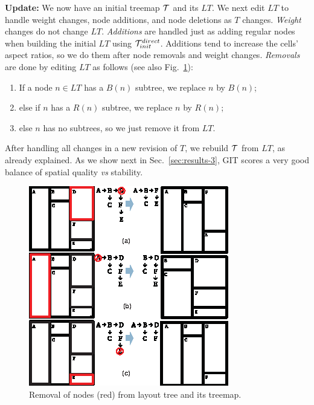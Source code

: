\noindent\textbf{Update:} We now have an initial treemap ${\cal T}$ and its $LT$. We next edit $LT$ to handle weight changes, node additions, and node deletions as $T$ changes. \emph{Weight} changes do not change $LT$. \emph{Additions} are handled just as adding regular nodes when building the initial $LT$ using ${\cal T}_{init}^{direct}$. Additions tend to increase the cells' aspect ratios, so we do them after node removals and weight changes. \emph{Removals} are done by editing $LT$ as follows (see also Fig.~\ref{fig:git_removal}):

\begin{enumerate}
\item If a node $n\in LT$ has a $B(n)$ subtree, we replace $n$ by $B(n)$;
\item else if $n$ has a $R(n)$ subtree, we replace $n$ by $R(n)$;
\item else $n$ has no subtrees, so we just remove it from $LT$.
\end{enumerate}

After handling all changes in a new revision of $T$, we rebuild ${\cal T}$ from $LT$, as already explained. As we show next in Sec.~\ref{sec:results-3}, GIT scores a very good balance of spatial quality \emph{vs} stability.

\begin{figure}[htbp!]
\centering
\includegraphics[width=.8\textwidth]{figures/treemap-algorithm/git_removal.eps}
\caption{Removal of nodes (red) from layout tree and its treemap.}
\label{fig:git_removal}
\end{figure}


